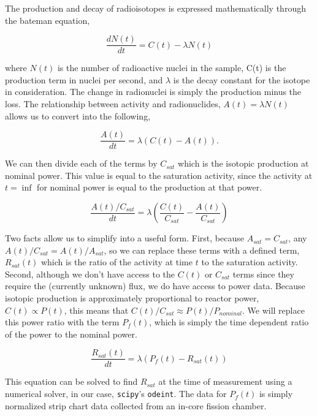 The production and decay of radioisotopes is expressed mathematically through the bateman equation,

\begin{equation}
\label{eqn:bateman}
\frac{dN(t)}{dt} = C(t) - \lambda N(t)
\end{equation}

where $N(t)$ is the number of radioactive nuclei in the sample, C(t) is the production term in nuclei per second, and $\lambda$ is the decay constant for the isotope in consideration.
The change in radionuclei is simply the production minus the loss.
The relationship between activity and radionuclides, $A(t) = \lambda N(t)$ allows us to convert  into the following,

\begin{equation}
\label{eqn:bateman_activity}
\frac{A(t)}{dt} = \lambda (C(t) - A(t)).
\end{equation}

We can then divide each of the terms by $C_{sat}$ which is the isotopic production at nominal power.
This value is equal to the saturation activity, since the activity at $t = \inf$ for nominal power is equal to the production at that power.

\begin{equation}
\label{eqn:bateman_ratios}
\frac{A(t) / C_{sat}}{dt} = \lambda (\frac{C(t)}{C_{sat}} - \frac{A(t)}{C_{sat}})
\end{equation}

Two facts allow us to simplify  into a useful form.
First, because $A_{sat} = C_{sat}$, any $A(t) / C_{sat} = A(t) / A_{sat}$, so we can replace these terms with a defined term, $R_{sat}(t)$ which is the ratio of the activity at time $t$ to the saturation activity.
Second, although we don't have access to the $C(t)$ or $C_{sat}$ terms since they require the (currently unknown) flux, we do have access to power data.
Because isotopic production is approximately proportional to reactor power, $C(t) \propto P(t)$, this means that $C(t) / C_{sat} \approx P(t) / P_{nominal}$.
We will replace this power ratio with the term $P_{f}(t)$, which is simply the time dependent ratio of the power to the nominal power.

\begin{equation}
\label{eqn:bateman_r_sat}
\frac{R_{sat}(t)}{dt} = \lambda (P_{f}(t) - R_{sat}(t))
\end{equation}

This equation can be solved to find $R_{sat}$ at the time of measurement using a numerical solver, in our case, {\tt scipy}'s {\tt odeint}.
The data for $P_{f}(t)$ is simply normalized strip chart data collected from an in-core fission chamber.



